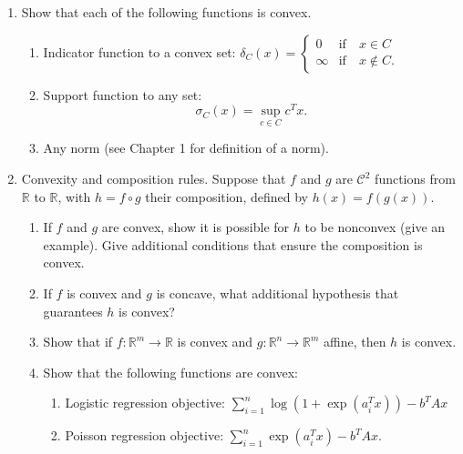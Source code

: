 \documentclass[11pt]{amsart}
\newcommand{\cC}{\mathcal{C}}
\begin{document}
\begin{enumerate}
\begin{enumerate}
\end{enumerate}



\bigskip\bigskip


\item Show that each of the following functions is convex. 

\begin{enumerate}
\item Indicator function to a convex set: 
\(
\delta_C(x) = \begin{cases} 0 & \mbox{if} \quad x \in C \\ \infty & \mbox{if} \quad x \not \in C. \end{cases}
\)

\item Support function to any set: 
\[
\sigma_C(x) = \sup_{c \in C} c^Tx.
\]

\item Any norm (see Chapter 1 for definition of a norm). 

\end{enumerate}

\bigskip\bigskip




\item  Convexity and composition rules. Suppose that $f$ and $g$ are $\cC^2$ functions from $\mathbb{R}$ to $\mathbb{R}$, with $h = f\circ g$ their composition, defined by 
\(
h(x) = f(g(x)).
\) 
\begin{enumerate}
\item If $f$ and $g$ are convex, show it is possible for $h$ to be nonconvex (give an example). Give additional conditions that ensure the composition is convex. 
\item If $f$ is convex and $g$ is concave, what additional hypothesis that guarantees $h$ is convex? 
\item Show that if $f: \mathbb{R}^m \rightarrow \mathbb{R}$ is convex and $g: \mathbb{R}^n \rightarrow \mathbb{R}^m$ affine, then $h$ is convex. 
\item Show that the following functions are convex: 
\begin{enumerate}
\item Logistic regression objective: $\sum_{i=1}^n \log(1+\exp(a_i^Tx))- b^TAx$
\item Poisson regression objective: $\sum_{i=1}^n \exp(a_i^Tx) - b^TAx$. 
\end{enumerate}
\end{enumerate}




\end{enumerate}
\end{document}
